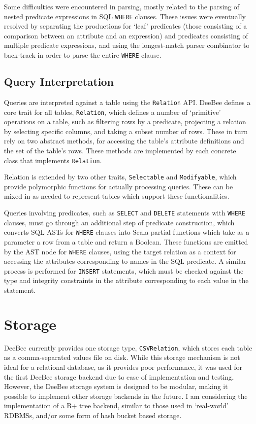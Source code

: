 Some difficulties were encountered in parsing, mostly related to the parsing of nested predicate expressions in SQL \texttt{WHERE} clauses. These issues were eventually resolved by separating the productions for `leaf' predicates (those consisting of a comparison between an attribute and an expression) and predicates consisting of multiple predicate expressions, and using the longest-match parser combinator to back-track in order to parse the entire \texttt{WHERE} clause.

\subsection{Query Interpretation}
\label{sec:query}
Queries are interpreted against a table using the \texttt{Relation} API. DeeBee defines a core trait for all tables, \texttt{Relation}, which defines a number of `primitive' operations on a table, such as filtering rows by a predicate, projecting a relation by selecting specific columns, and taking a subset number of rows. These in turn rely on two abstract methods, for accessing the table's attribute definitions and the set of the table's rows. These methods are implemented by each concrete class that implements \texttt{Relation}.

Relation is extended by two other traits, \texttt{Selectable} and \texttt{Modifyable}, which provide polymorphic functions for actually processing queries. These can be mixed in as needed to represent tables which support these functionalities.

Queries involving predicates, such as \texttt{SELECT} and \texttt{DELETE} statements with \texttt{WHERE} clauses, must go through an additional step of predicate construction, which converts SQL ASTs for \texttt{WHERE} clauses into Scala partial functions which take as a parameter a row from a table and return a Boolean. These functions are emitted by the AST node for \texttt{WHERE} clauses, using the target relation as a context for accessing the attributes corresponding to names in the SQL predicate. A similar process is performed for \texttt{INSERT} statements, which must be checked against the type and integrity constraints in the attribute corresponding to each value in the statement.

\section{Storage}
\label{sec:storage}
DeeBee currently provides one storage type, \texttt{CSVRelation}, which stores each table as a comma-separated values file on disk. While this storage mechanism is not ideal for a relational database, as it provides poor performance, it was used for the first DeeBee storage backend due to ease of implementation and testing. However, the DeeBee storage system is designed to be modular, making it possible to implement other storage backends in the future. I am considering the implementation of a B+ tree backend, similar to those used in `real-world' RDBMSs, and/or some form of hash bucket based storage.

